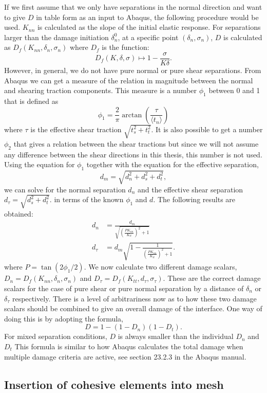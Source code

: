 \documentclass[grain_boundary_law.tex]{subfiles}
\begin{document}
If we first assume that we only have separations in the normal direction and want to give $D$ in table form as an input to Abaqus, the following procedure would be used. $K_{nn}$ is calculated as the slope of the initial elastic response. For separations larger than the damage initiation $\delta_n^0$,  at a specific point $(\delta_n, \sigma_n)$, $D$ is calculated as $D_f(K_{nn}, \delta_n, \sigma_n)$ where $D_f$ is the function:
%
\[ D_f(K, \delta, \sigma) \mapsto   1 - \frac{\sigma}{K\delta}. \]
%
However, in general, we do not have pure normal or pure shear separations. From Abaqus we can get a measure of the relation in magnitude between the normal and shearing traction components. This measure is a number $\phi_1$ between 0 and 1 that is defined as
%
\[ \phi_1 = \frac{2}{\pi} \arctan \left( \frac{ \tau}{\langle t_n \rangle} \right) \]
%
where $\tau$ is the effective shear traction $\sqrt{t_s^2 + t_t^2}$. It is also possible to get a number $\phi_2$ that gives a relation between the shear tractions but since we will not assume any difference between the shear directions in this thesis, this number is not used. Using the equation for $\phi_1$ together with the equation for the effective separation,
%
\[ d_m = \sqrt{d_n^2 + d_s^2 + d_t^2},  \]
%
we can solve for the normal separation $d_n$ and the effective shear separation $ d_\tau = \sqrt{d_s^2 + d_t^2}.$ in terms of the known $\phi_1$ and $d$. The following results are obtained:
%
\begin{align}
 d_n & = \frac{d_m}{\sqrt{\left(\frac{PK_{nn}}{K_{tt}}\right)^2 + 1 }  }  \\
 d_\tau  & = d_m\sqrt{1 -\frac{1}{\left(\frac{PK_{nn}}{K_{tt}} \right)^2 + 1 }}.
\end{align}
%
where $P = \tan(2 \phi_1 / 2)$. We now calculate two different damage scalars, $D_n = D_f(K_{nn}, \delta_n, \sigma_n)$ and $D_\tau = D_f(K_{tt}, d_\tau, \sigma_\tau)$. These are the correct damage scalars for the case of pure shear or pure normal separation by a distance of $\delta_n$ or $\delta_\tau$ respectively. There is a level of arbitrariness now as to how these two damage scalars should be combined to give an overall damage of the interface. One way of doing this is by adopting the formula,
%
\[ D = 1 - (1 - D_n)(1 - D_t). \]
%
For mixed separation conditions, $D$ is always smaller than the individual $D_n$ and $D_t$ This formula is similar to how Abaqus calculates the total damage when multiple damage criteria are active, see section 23.2.3 in the Abaqus manual. 


\subsection{Insertion of cohesive elements into mesh}
\end{document}
